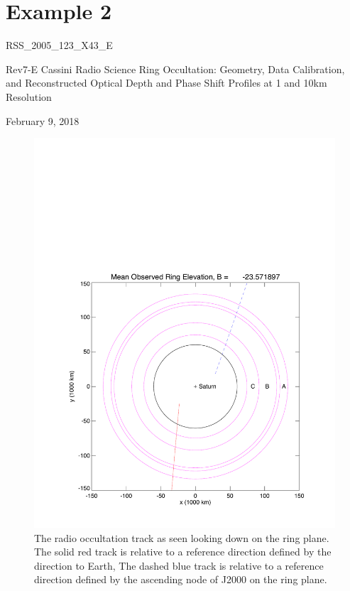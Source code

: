 \documentclass[crop=false,class=book]{standalone}
\begin{document}
\section{Example 2}
\begin{center}
    \LARGE{RSS\_2005\_123\_X43\_E \par
	Rev7-E Cassini Radio Science Ring Occultation: Geometry, Data Calibration, and Reconstructed Optical Depth and Phase Shift Profiles at 1 and 10km Resolution \par
	February 9, 2018\par}
\end{center}
\begin{figure}[H]
    \centering
    \includegraphics[page=1,trim = {0.67in 0.5in 0.5in 3.1in},clip,width=\textwidth]{Rev007_E_X43_summary_p1_08FEB2018.pdf}
    \caption[Radio Occultation Track]{The radio occultation track as seen looking down on the ring plane. The solid red track is relative to a reference direction defined by the direction to Earth, The dashed blue track is relative to a reference direction defined by the ascending node of J2000 on the ring plane.}
\end{figure}
\end{document}
